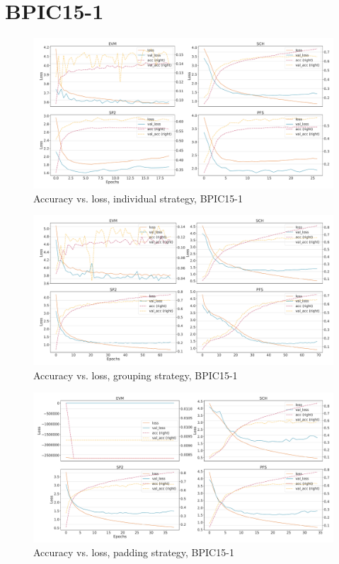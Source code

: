 \section*{BPIC15-1}
\begin{figure}[!htb]
    \centering
    \includegraphics[width=\textwidth]{gfx/bpic2015_1/individual_loss_acc_curve.pdf}
    \caption{Accuracy vs. loss, individual strategy, BPIC15-1}
\end{figure}
\begin{figure}[!htb]
    \centering
    \includegraphics[width=\textwidth]{gfx/bpic2015_1/grouped_loss_acc_curve.pdf}
    \caption{Accuracy vs. loss, grouping strategy, BPIC15-1}
\end{figure}
\begin{figure}[!htb]
    \centering
    \includegraphics[width=\textwidth]{gfx/bpic2015_1/padded_loss_acc_curve.pdf}
    \caption{Accuracy vs. loss, padding strategy, BPIC15-1}
\end{figure}
